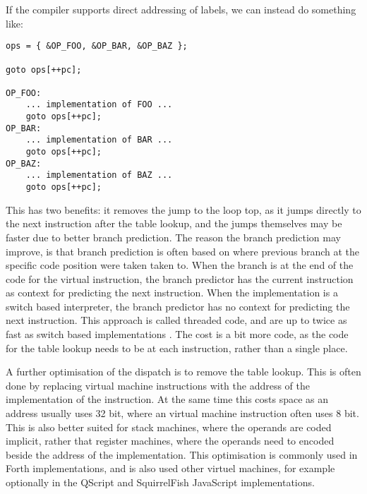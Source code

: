 \documentclass[11pt]{report}
\begin{document}
If the compiler supports direct addressing of labels, we can instead do something like:
\begin{verbatim}
ops = { &OP_FOO, &OP_BAR, &OP_BAZ };
   
goto ops[++pc];

OP_FOO:
    ... implementation of FOO ...
    goto ops[++pc];
OP_BAR:
    ... implementation of BAR ...
    goto ops[++pc];
OP_BAZ:
    ... implementation of BAZ ...
    goto ops[++pc];
\end{verbatim}
This has two benefits: it removes the jump to the loop top, as it jumps directly to the next instruction after the table lookup, and the jumps themselves may be faster due to better branch prediction.
The reason the branch prediction may improve, is that branch prediction is often based on where previous branch at the specific code position were taken taken to. 
When the branch is at the end of the code for the virtual instruction,
the branch predictor has the current instruction as context for predicting the next instruction.
When the implementation is a switch based interpreter, the branch predictor has no context for predicting the next instruction.
This approach is called threaded code, and are up to twice as fast as switch based implementations \cite{ertl-efficient-2003}.
The cost is a bit more code, as the code for the table lookup needs to be at each instruction, rather than a single place. 

A further optimisation of the dispatch is to remove the table lookup. This is often done by replacing virtual machine instructions with the address of the implementation of the instruction. At the same time this costs space as an address usually uses 32 bit, where an virtual machine instruction often uses 8 bit. This is also better suited for stack machines, where the operands are coded implicit, rather that register machines, where the operands need to encoded beside the address of the implementation. This optimisation is commonly used in Forth implementations, and is also used other virtuel machines, for example optionally in the QScript \cite{qscript} and SquirrelFish \cite{webkit-source} JavaScript implementations.
\end{document}
